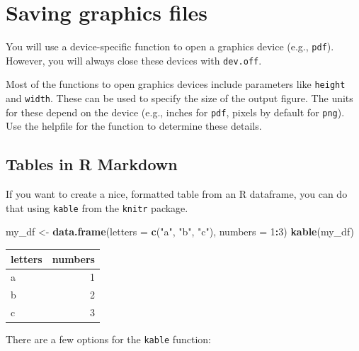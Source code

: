 \documentclass[]{book}
\makeatletter
\newenvironment{Shaded}{\begin{snugshade}}{\end{snugshade}}
\newcommand{\KeywordTok}[1]{\textcolor[rgb]{0.13,0.29,0.53}{\textbf{#1}}}
\newcommand{\DataTypeTok}[1]{\textcolor[rgb]{0.13,0.29,0.53}{#1}}
\newcommand{\DecValTok}[1]{\textcolor[rgb]{0.00,0.00,0.81}{#1}}
\newcommand{\StringTok}[1]{\textcolor[rgb]{0.31,0.60,0.02}{#1}}
\newcommand{\OperatorTok}[1]{\textcolor[rgb]{0.81,0.36,0.00}{\textbf{#1}}}
\newcommand{\NormalTok}[1]{#1}
\newenvironment{kframe}{%
\medskip{}
\setlength{\fboxsep}{.8em}
 \def\at@end@of@kframe{}%
 \ifinner\ifhmode%
  \def\at@end@of@kframe{\end{minipage}}%
  \begin{minipage}{\columnwidth}%
 \fi\fi%
 \def\FrameCommand##1{\hskip\@totalleftmargin \hskip-\fboxsep
 \colorbox{shadecolor}{##1}\hskip-\fboxsep
     \hskip-\linewidth \hskip-\@totalleftmargin \hskip\columnwidth}%
 \MakeFramed {\advance\hsize-\width
   \@totalleftmargin\z@ \linewidth\hsize
   \@setminipage}}%
 {\par\unskip\endMakeFramed%
 \at@end@of@kframe}
\renewenvironment{Shaded}{\begin{kframe}}{\end{kframe}}
\theoremstyle{definition}
\theoremstyle{definition}
\theoremstyle{definition}
\theoremstyle{remark}
\makeatother
\begin{document}
\section{Saving graphics files}\label{saving-graphics-files-1}

You will use a device-specific function to open a graphics device (e.g.,
\texttt{pdf}). However, you will always close these devices with
\texttt{dev.off}.

Most of the functions to open graphics devices include parameters like
\texttt{height} and \texttt{width}. These can be used to specify the
size of the output figure. The units for these depend on the device
(e.g., inches for \texttt{pdf}, pixels by default for \texttt{png}). Use
the helpfile for the function to determine these details.

\subsection{Tables in R Markdown}\label{tables-in-r-markdown}

If you want to create a nice, formatted table from an R dataframe, you
can do that using \texttt{kable} from the \texttt{knitr} package.

\begin{Shaded}
\begin{Highlighting}[]
\NormalTok{my_df <-}\StringTok{ }\KeywordTok{data.frame}\NormalTok{(}\DataTypeTok{letters =} \KeywordTok{c}\NormalTok{(}\StringTok{"a"}\NormalTok{, }\StringTok{"b"}\NormalTok{, }\StringTok{"c"}\NormalTok{),}
                    \DataTypeTok{numbers =} \DecValTok{1}\OperatorTok{:}\DecValTok{3}\NormalTok{)}
\KeywordTok{kable}\NormalTok{(my_df)}
\end{Highlighting}
\end{Shaded}

\begin{tabular}{l|r}
\hline
letters & numbers\\
\hline
a & 1\\
\hline
b & 2\\
\hline
c & 3\\
\hline
\end{tabular}

There are a few options for the \texttt{kable} function:
\end{document}
